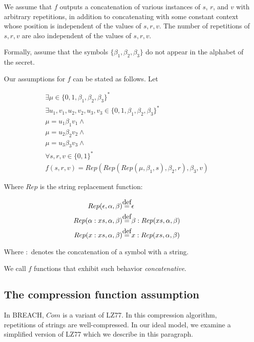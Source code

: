 \documentclass{sig-alternate-05-2015}
\newcommand\defeq{\stackrel{\mathclap{\normalfont\mbox{def}}}{=}}
\begin{document}
We assume that $f$ outputs a concatenation of various instances of $s$, $r$,
and $v$ with arbitrary repetitions, in addition to concatenating with some
constant context whose position is independent of the values of $s, r, v$.  The
number of repetitions of $s, r, v$ are also independent of the values of $s, r,
v$.

Formally, assume that the symbols $\{\beta_1, \beta_2, \beta_3\}$ do not appear
in the alphabet of the secret.

Our assumptions for $f$ can be stated as follows. Let

\begin{equation*}
\begin{split}
\exists \mu \in \{0, 1, \beta_1, \beta_2, \beta_3\}^*\\
\exists u_1, v_1, u_2, v_2, u_3, v_3 \in \{0, 1, \beta_1, \beta_2, \beta_3\}^*\\
\mu = u_1 \beta_1 v_1 \land\\
\mu = u_2 \beta_2 v_2 \land\\
\mu = u_3 \beta_3 v_3 \land\\
\forall s, r, v \in \{0, 1\}^*\\
f(s, r, v) = Rep(Rep(Rep(\mu, \beta_1, s), \beta_2, r), \beta_3, v)
\end{split}
\end{equation*}

Where $Rep$ is the string replacement function:

\begin{align*}
Rep(\epsilon, \alpha, \beta) &\defeq \epsilon\\
Rep(\alpha:xs, \alpha, \beta) &\defeq \beta:Rep(xs, \alpha, \beta)\\
Rep(x:xs, \alpha, \beta) &\defeq x:Rep(xs, \alpha, \beta)
\end{align*}

Where $:$ denotes the concatenation of a symbol with a string.

We call $f$ functions that exhibit such behavior \textit{concatenative}.

\subsection{The compression function assumption}\label{subsec:comfuncassumption}

In BREACH, $Com$ is a variant of LZ77. In this compression algorithm,
repetitions of strings are well-compressed. In our ideal model, we examine a
simplified version of LZ77 which we describe in this paragraph.
\end{document}
